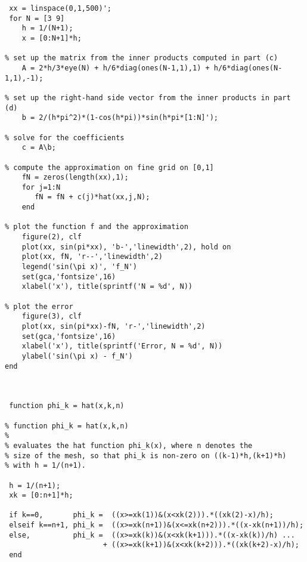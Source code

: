{\footnotesize\begin{verbatim}
 xx = linspace(0,1,500)';
 for N = [3 9]
    h = 1/(N+1);
    x = [0:N+1]*h;

% set up the matrix from the inner products computed in part (c)
    A = 2*h/3*eye(N) + h/6*diag(ones(N-1,1),1) + h/6*diag(ones(N-1,1),-1);  

% set up the right-hand side vector from the inner products in part (d)
    b = 2/(h*pi^2)*(1-cos(h*pi))*sin(h*pi*[1:N]');

% solve for the coefficients 
    c = A\b;

% compute the approximation on fine grid on [0,1]
    fN = zeros(length(xx),1);
    for j=1:N
       fN = fN + c(j)*hat(xx,j,N);
    end

% plot the function f and the approximation
    figure(2), clf
    plot(xx, sin(pi*xx), 'b-','linewidth',2), hold on
    plot(xx, fN, 'r--','linewidth',2)
    legend('sin(\pi x)', 'f_N')
    set(gca,'fontsize',16)
    xlabel('x'), title(sprintf('N = %d', N))

% plot the error
    figure(3), clf
    plot(xx, sin(pi*xx)-fN, 'r-','linewidth',2)
    set(gca,'fontsize',16)
    xlabel('x'), title(sprintf('Error, N = %d', N))
    ylabel('sin(\pi x) - f_N')
end



 function phi_k = hat(x,k,n)

% function phi_k = hat(x,k,n)
%
% evaluates the hat function phi_k(x), where n denotes the
% size of the mesh, so that phi_k is non-zero on ((k-1)*h,(k+1)*h)
% with h = 1/(n+1).

 h = 1/(n+1);
 xk = [0:n+1]*h;

 if k==0,       phi_k =  ((x>=xk(1))&(x<xk(2))).*((xk(2)-x)/h);
 elseif k==n+1, phi_k =  ((x>=xk(n+1))&(x<=xk(n+2))).*((x-xk(n+1))/h);
 else,          phi_k =  ((x>=xk(k))&(x<xk(k+1))).*((x-xk(k))/h) ...
                       + ((x>=xk(k+1))&(x<xk(k+2))).*((xk(k+2)-x)/h);
 end

\end{verbatim}}
